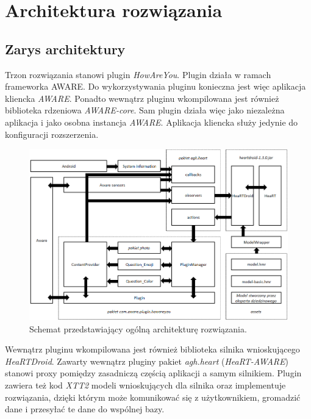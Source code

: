 \chapter{Architektura rozwiązania}
\label{cha:architekturaRozwiazania}


\section{Zarys architektury}
\label{sec:zarysArchitektury}

Trzon rozwiązania stanowi plugin \textit{HowAreYou}. Plugin działa w ramach frameworka AWARE. Do wykorzystywania pluginu konieczna jest więc aplikacja kliencka \textit{AWARE}. Ponadto wewnątrz pluginu wkompilowana jest również biblioteka rdzeniowa \textit{AWARE-core}. Sam plugin działa więc jako niezależna aplikacja i jako osobna instancja \textit{AWARE}. Aplikacja kliencka służy jedynie do konfiguracji rozszerzenia.

\begin{figure}[H]
	\centering
	\includegraphics[scale=0.8]{rozdzial3/ArchitekturaSchemat.png}
	\caption{Schemat przedstawiający ogólną architekturę rozwiązania.}
\end{figure}

Wewnątrz pluginu wkompilowana jest również biblioteka silnika wnioskującego \textit{HeaRTDroid}. Zawarty wewnątrz pluginy pakiet \textit{agh.heart} (\textit{HeaRT-AWARE}) stanowi proxy pomiędzy zasadniczą częścią aplikacji a samym silnikiem. Plugin zawiera też kod \textit{XTT2} modeli wnioskujących dla silnika oraz implementuje rozwiązania, dzięki którym może komunikować się z użytkownikiem, gromadzić dane i przesyłać te dane do wspólnej bazy. 

